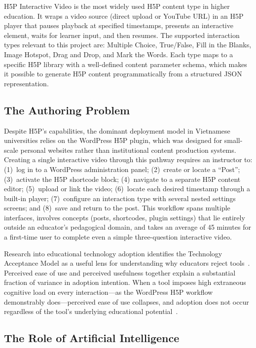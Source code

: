 H5P Interactive Video is the most widely used H5P content type in higher
education. It wraps a video source (direct upload or YouTube URL) in an
H5P player that pauses playback at specified timestamps, presents an
interactive element, waits for learner input, and then resumes. The
supported interaction types relevant to this project are: Multiple Choice,
True/False, Fill in the Blanks, Image Hotspot, Drag and Drop, and Mark the
Words. Each type maps to a specific H5P library with a well-defined content
parameter schema, which makes it possible to generate H5P content
programmatically from a structured JSON representation.

\subsection{The Authoring Problem}

Despite H5P's capabilities, the dominant deployment model in Vietnamese
universities relies on the WordPress H5P plugin, which was designed for
small-scale personal websites rather than institutional content production
systems. Creating a single interactive video through this pathway requires
an instructor to: (1)~log in to a WordPress administration panel; (2)~create
or locate a ``Post''; (3)~activate the H5P shortcode block; (4)~navigate to
a separate H5P content editor; (5)~upload or link the video; (6)~locate each
desired timestamp through a built-in player; (7)~configure an interaction
type with several nested settings screens; and (8)~save and return to the
post. This workflow spans multiple interfaces, involves concepts (posts,
shortcodes, plugin settings) that lie entirely outside an educator's
pedagogical domain, and takes an average of 45 minutes for a first-time
user to complete even a simple three-question interactive video.

Research into educational technology adoption identifies the Technology
Acceptance Model as a useful lens for understanding why educators reject
tools~\cite{davis1989}. Perceived ease of use and perceived usefulness
together explain a substantial fraction of variance in adoption intention.
When a tool imposes high extraneous cognitive load on every interaction---as
the WordPress H5P workflow demonstrably does---perceived ease of use
collapses, and adoption does not occur regardless of the tool's underlying
educational potential~\cite{sweller1988,chandler1991}.

\subsection{The Role of Artificial Intelligence}

